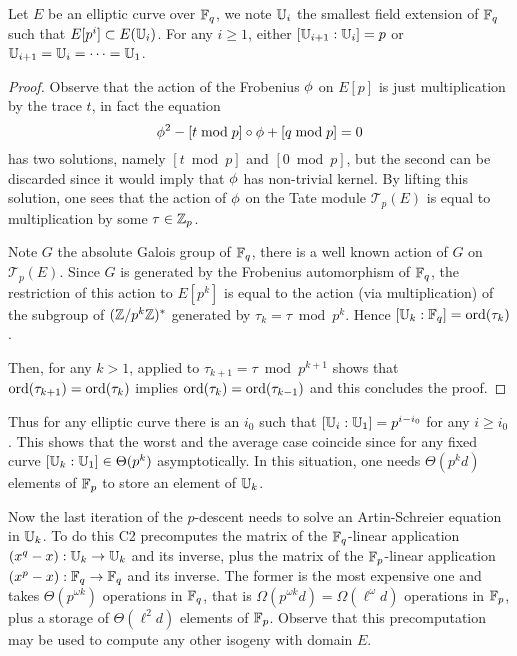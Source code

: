 \begin{proposition}
  \label{th:tower}
  Let $E$ be an elliptic curve over $\mathbb{F}_q$, we note $\mathbb{U}_i$ the
  smallest field extension of $\mathbb{F}_q$ such that $E[p^i]\subset
  E(\mathbb{U}_i)$. For any $i\ge1$, either $[\mathbb{U}_{i+1}:\mathbb{U}_i] = p$ or
  $\mathbb{U}_{i+1}=\mathbb{U}_i=\cdots=\mathbb{U}_1$.
\end{proposition}
\begin{proof}
  Observe that the action of the Frobenius $\phi$ on $E[p]$ is
  just multiplication by the trace $t$, in fact the equation
  \[\phi^2 - [t \bmod p]\circ\phi + [q \bmod p] = 0\]
  has two solutions, namely $[t \bmod p]$ and $[0 \bmod p]$, but the
  second can be discarded since it would imply that $\phi$ has
  non-trivial kernel.  By lifting this solution, one sees that the
  action of $\phi$ on the Tate module $\mathcal{T}_p(E)$ is equal
  to multiplication by some $\tau\in\mathbb{Z}_p$.

  Note $G$ the absolute Galois group of $\mathbb{F}_q$, there is a well known
  action of $G$ on $\mathcal{T}_p(E)$. Since $G$ is generated by the
  Frobenius automorphism of $\mathbb{F}_q$, the restriction of this action to
  $E[p^k]$ is equal to the action (via multiplication) of the subgroup
  of $(\mathbb{Z}/p^k\mathbb{Z})^\ast$ generated by $\tau_k = \tau \bmod p^k$. Hence
  $[\mathbb{U}_k:\mathbb{F}_q] = \operatorname{ord}(\tau_k)$.

  Then, for any $k>1$, \cite[Corollary 4]{Ler97} applied to
  $\tau_{k+1}=\tau\bmod p^{k+1}$ shows that
  $\operatorname{ord}(\tau_{k+1})=\operatorname{ord}(\tau_k)$ implies
  $\operatorname{ord}(\tau_k)=\operatorname{ord}(\tau_{k-1})$ and this concludes the proof.
\end{proof}

Thus for any elliptic curve there is an $i_0$ such that $[\mathbb{U}_i:\mathbb{U}_1] =
p^{i-i_0}$ for any $i \ge i_0$. This shows that the worst and the
average case coincide since for any fixed curve $[\mathbb{U}_k:\mathbb{U}_1] \in
\Theta(p^k)$ asymptotically. In this situation, one needs
$\Theta(p^kd)$ elements of $\mathbb{F}_p$ to store an element of $\mathbb{U}_k$.

Now the last iteration of the $p$-descent needs to solve an
Artin-Schreier equation in $\mathbb{U}_k$. To do this C2 precomputes the
matrix of the $\mathbb{F}_q$-linear application $(x^q-x):\mathbb{U}_k\rightarrow\mathbb{U}_k$
and its inverse, plus the matrix of the $\mathbb{F}_p$-linear application
$(x^p-x):\mathbb{F}_q\rightarrow\mathbb{F}_q$ and its inverse. The former is the most
expensive one and takes $\Theta(p^{\omega k})$ operations in $\mathbb{F}_q$,
that is $\Omega(p^{\omega k}d) = \Omega(\ell^\omega d)$ operations in
$\mathbb{F}_p$, plus a storage of $\Theta(\ell^2d)$ elements of
$\mathbb{F}_p$. Observe that this precomputation may be used to compute any
other isogeny with domain $E$.

